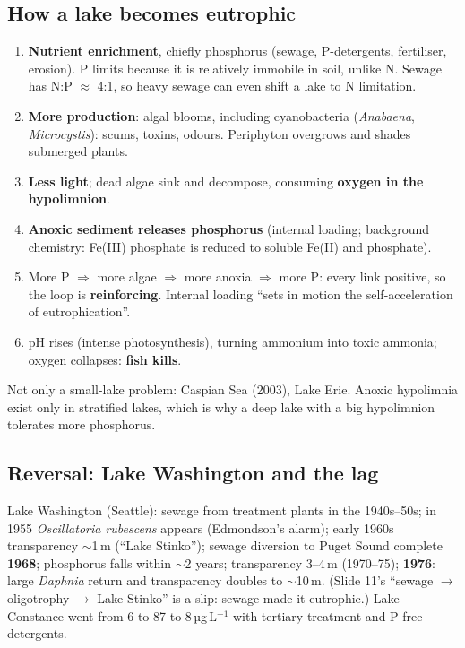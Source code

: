 \subsection{How a lake becomes eutrophic}
\begin{chain}
\begin{enumerate}
\item \textbf{Nutrient enrichment}, chiefly phosphorus (sewage, P-detergents, fertiliser, erosion). P limits because it
is relatively immobile in soil, unlike N. Sewage has N:P $\approx$ 4:1, so heavy sewage can even shift a lake to
N limitation.
\item \textbf{More production}: algal blooms, including cyanobacteria (\emph{Anabaena}, \emph{Microcystis}): scums,
toxins, odours. Periphyton overgrows and shades submerged plants.
\item \textbf{Less light}; dead algae sink and decompose, consuming \textbf{oxygen in the hypolimnion}.
\item \textbf{Anoxic sediment releases phosphorus} (internal loading; background chemistry: Fe(III) phosphate is
reduced to soluble Fe(II) and phosphate).
\item More P $\Rightarrow$ more algae $\Rightarrow$ more anoxia $\Rightarrow$ more P: every link positive, so the loop is
\textbf{reinforcing}. Internal loading ``sets in motion the self-acceleration of eutrophication''.
\item pH rises (intense photosynthesis), turning ammonium into toxic ammonia; oxygen collapses: \textbf{fish kills}.
\end{enumerate}
Not only a small-lake problem: Caspian Sea (2003), Lake Erie. Anoxic hypolimnia exist only in stratified lakes, which is
why a deep lake with a big hypolimnion tolerates more phosphorus.
\end{chain}

\subsection{Reversal: Lake Washington and the lag}
Lake Washington (Seattle): sewage from treatment plants in the 1940s--50s; in 1955 \emph{Oscillatoria rubescens}
appears (Edmondson's alarm); early 1960s transparency $\sim$1\,m (``Lake Stinko''); sewage diversion to Puget Sound
complete \textbf{1968}; phosphorus falls within $\sim$2 years; transparency 3--4\,m (1970--75); \textbf{1976}: large
\emph{Daphnia} return and transparency doubles to $\sim$10\,m. (Slide 11's ``sewage $\to$ oligotrophy $\to$ Lake
Stinko'' is a slip: sewage made it eutrophic.) Lake Constance went from 6 to 87 to 8\,µg\,L$^{-1}$ with tertiary
treatment and P-free detergents.

